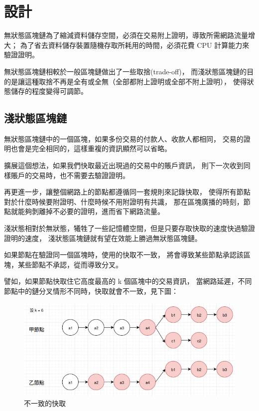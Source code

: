 \graphicspath{ {./images/} }
\chapter{設計}
\label{c:design}

無狀態區塊鏈為了縮減資料儲存空間，必須在交易附上證明，導致所需網路流量增大；
為了省去資料儲存裝置隨機存取所耗用的時間，必須花費 CPU 計算能力來驗證證明。

無狀態區塊鏈相較於一般區塊鏈做出了一些取捨(trade-off)，
而淺狀態區塊鏈的目的是讓這種取捨不再是全有或全無（全部都附上證明或全部不附上證明），
使得狀態儲存的程度變得可調節。

\section{淺狀態區塊鏈}

無狀態區塊鏈中的一個區塊，如果多份交易的付款人、收款人都相同，
交易的證明也會是完全相同的，這樣重複的資訊顯然可以省略。

擴展這個想法，如果我們快取最近出現過的交易中的賬戶資訊，
則下一次收到同樣賬戶的交易時，也不需要去驗證證明。

再更進一步，讓整個網路上的節點都遵循同一套規則來記錄快取，
使得所有節點對於什麼時候要附證明、什麼時候不用附證明有共識，
那在區塊廣播的時刻，節點就能夠剝離掉不必要的證明，進而省下網路流量。

淺狀態相對於無狀態，犧牲了一些記憶體空間，但是只要存取快取的速度快過驗證證明的速度，
淺狀態區塊鏈就有望在效能上勝過無狀態區塊鏈。


如果節點在驗證同一個區塊時，使用的快取不一致，
將會導致某些節點承認該區塊，某些節點不承認，從而導致分叉。

譬如，如果節點快取住它高度最高的 k 個區塊中的交易資訊，
當網路延遲，不同節點中的鏈分叉情形不同時，快取就會不一致，見下圖：

\begin{figure}[h]
\includegraphics[width=\textwidth]{wrong-cache}
\caption{不一致的快取}
\end{figure}

